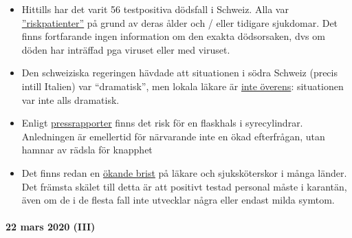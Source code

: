 \begin{itemize}
\tightlist
\item
  Hittills har det varit 56 testpositiva dödsfall i Schweiz. Alla var
  \href{https://www.nzz.ch/schweiz/coronavirus-in-der-schweiz-die-neusten-entwicklungen-ld.1542664\#subtitle-wie-viele-infizierte-und-todesf-lle-gibt-es-second}{''riskpatienter''}
  på grund av deras ålder och / eller tidigare sjukdomar. Det finns
  fortfarande ingen information om den exakta dödsorsaken, dvs om döden
  har inträffad pga viruset eller med viruset.
\item
  Den schweiziska regeringen hävdade att situationen i södra Schweiz
  (precis intill Italien) var ``dramatisk'', men lokala läkare är
  \href{https://www.nzz.ch/schweiz/punkto-intensivbetten-sind-wir-im-tessin-besser-ausgeruestet-als-der-rest-der-schweiz-ld.1547728}{inte
  överens}: situationen var inte alls dramatisk.
\item
  Enligt
  \href{https://www.blick.ch/news/schweiz/nicht-nur-beatmungsgeraete-werden-knapp-im-kampf-gegen-corona-es-droht-ein-engpass-beim-sauerstoff-id15808185.html}{pressrapporter}
  finns det risk för en flaskhals i syrecylindrar. Anledningen är
  emellertid för närvarande inte en ökad efterfrågan, utan hamnar av
  rädsla för knapphet
\item
  Det finns redan en
  \href{https://www.washingtonpost.com/health/covid-19-hits-doctors-nurses-emts-threatening-health-system/2020/03/17/f21147e8-67aa-11ea-b313-df458622c2cc_story.html}{ökande
  brist} på läkare och sjuksköterskor i många länder. Det främsta skälet
  till detta är att positivt testad personal måste i karantän, även om
  de i de flesta fall inte utvecklar några eller endast milda symtom.
\end{itemize}

\hypertarget{22-mars-2020-iii}{%
\paragraph{22 mars 2020 (III)}\label{22-mars-2020-iii}}

